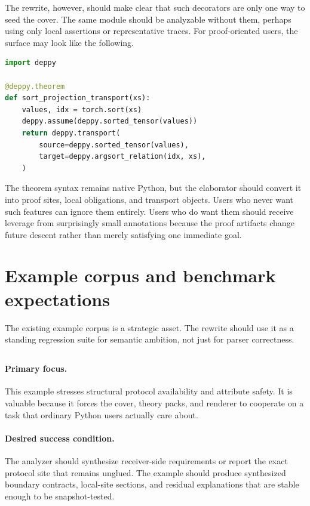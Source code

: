 \documentclass[11pt]{report}
\DeclareRobustCommand{\py}[1]{\texttt{\detokenize{#1}}}
\theoremstyle{definition}
\theoremstyle{plain}
\begin{document}
The rewrite, however, should make clear that such decorators are only one way to
seed the cover. The same module should be analyzable without them, perhaps using
only local assertions or representative traces. For proof-oriented users, the
surface may look like the following.

\begin{lstlisting}[style=deppy,language=Python]
import deppy

@deppy.theorem
def sort_projection_transport(xs):
    values, idx = torch.sort(xs)
    deppy.assume(deppy.sorted_tensor(values))
    return deppy.transport(
        source=deppy.sorted_tensor(values),
        target=deppy.argsort_relation(idx, xs),
    )
\end{lstlisting}

The theorem syntax remains native Python, but the elaborator should convert it
into proof sites, local obligations, and transport objects. Users who never want
such features can ignore them entirely. Users who do want them should receive
leverage from surprisingly small annotations because the proof artifacts change
future descent rather than merely satisfying one immediate goal.


\section{Example corpus and benchmark expectations}

The existing example corpus is a strategic asset. The rewrite should use it as a standing regression suite for semantic ambition, not just for parser correctness.
\subsection{\py{examples/protocol_mismatch.py}}

\paragraph{Primary focus.}
This example stresses structural protocol availability and attribute safety. It is valuable because it forces the cover,
theory packs, and renderer to cooperate on a task that ordinary Python users
actually care about.

\paragraph{Desired success condition.}
The analyzer should synthesize receiver-side requirements or report the exact protocol site that remains unglued. The example should produce synthesized boundary contracts,
local-site sections, and residual explanations that are stable enough to be
snapshot-tested.
\end{document}
